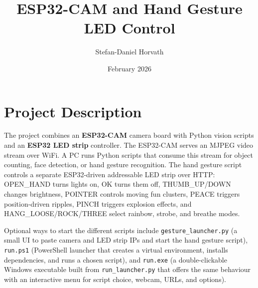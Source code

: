 \documentclass[a4paper,12pt]{article}
\title{\textbf{ESP32-CAM and Hand Gesture LED Control}}
\author{Stefan-Daniel Horvath}
\date{February 2026}
\begin{document}
\maketitle

\tableofcontents
\newpage

\section{Project Description}
The project combines an \textbf{ESP32-CAM} camera board with Python vision scripts and an \textbf{ESP32 LED strip} controller. The ESP32-CAM serves an MJPEG video stream over WiFi. A PC runs Python scripts that consume this stream for object counting, face detection, or hand gesture recognition. 
The hand gesture script controls a separate ESP32-driven addressable LED strip over HTTP: OPEN\_HAND turns lights on, OK turns them off, THUMB\_UP/DOWN changes brightness, POINTER controls moving fun clusters, PEACE triggers position-driven ripples, PINCH triggers explosion effects, and HANG\_LOOSE/ROCK/THREE select rainbow, strobe, and breathe modes.

Optional ways to start the different scripts include \texttt{gesture\_launcher.py} (a small UI to paste camera and LED strip IPs and start the hand gesture script), \texttt{run.ps1} (PowerShell launcher that creates a virtual environment, installs dependencies, and runs a chosen script), and \texttt{run.exe} (a double-clickable Windows executable built from \texttt{run\_launcher.py} that offers the same behaviour with an interactive menu for script choice, webcam, URLs, and options).
\end{document}
